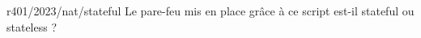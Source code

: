 \begin{question}{r401/2023/nat/stateful}
  Le pare-feu mis en place grâce à ce script est-il stateful ou
  stateless ?
  \begin{reponseshoriz}
    
    
    
  \end{reponseshoriz}
\end{question}
